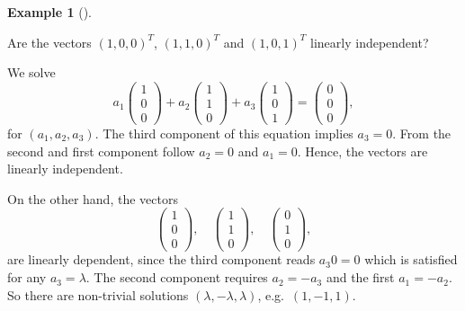 \documentclass[
  a4paper,
  DIV=11,
  numbers=noendperiod,
  oneside]{scrreprt}
\theoremstyle{definition}
\newtheorem{example}{Example}[chapter]
\theoremstyle{remark}
\begin{document}
\begin{example}[]\protect\hypertarget{exm-}{}\label{exm-}

Are the vectors \((1,0,0)^{T}\), \((1,1,0)^{T}\) and \((1,0,1)^{T}\)
linearly independent?

We solve
\[a_{1} \scriptstyle \begin{pmatrix}   1 \\ 0 \\ 0  \end{pmatrix} \textstyle + a_{2} \scriptstyle \begin{pmatrix}   1 \\ 1 \\ 0  \end{pmatrix} \textstyle + a_{3} \scriptstyle \begin{pmatrix}   1 \\ 0 \\ 1  \end{pmatrix} \textstyle = \scriptstyle \begin{pmatrix}   0\\0\\0  \end{pmatrix} \textstyle,\]
for \((a_{1},a_{2},a_{3})\). The third component of this equation
implies \(a_{3}=0\). From the second and first component follow
\(a_{2}=0\) and \(a_{1} =0\). Hence, the vectors are linearly
independent.

On the other hand, the vectors
\[\scriptstyle \begin{pmatrix}   1 \\ 0 \\ 0  \end{pmatrix} \textstyle, \quad \scriptstyle \begin{pmatrix}   1 \\ 1 \\ 0  \end{pmatrix} \textstyle,  \quad \scriptstyle \begin{pmatrix}   0 \\ 1 \\ 0  \end{pmatrix} \textstyle,\]
are linearly dependent, since the third component reads \(a_{3} 0 = 0\)
which is satisfied for any \(a_{3}=\lambda\). The second component
requires \(a_{2} = - a_{3}\) and the first \(a_{1} = - a_{2}\). So there
are non-trivial solutions \((\lambda , -\lambda , \lambda )\),
e.g.~\((1,-1,1)\).

\end{example}
\end{document}
